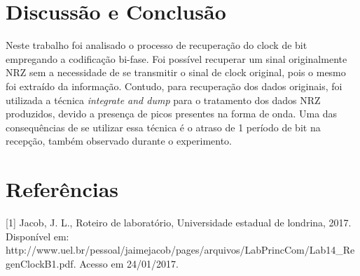\newpage
\section{Discussão e Conclusão}

	Neste trabalho foi analisado o processo de recuperação do clock de bit empregando a codificação bi-fase. Foi possível recuperar um sinal originalmente NRZ sem a necessidade de se transmitir o sinal de clock original, pois o mesmo foi extraído da informação. Contudo, para recuperação dos dados originais, foi utilizada a técnica \textit{integrate and dump} para o tratamento dos dados NRZ produzidos, devido a presença de picos presentes na forma de onda. Uma das consequências de se utilizar essa técnica é o atraso de 1 período de bit na recepção, também observado durante o experimento.
	
\newpage
\section{Referências}
[1] Jacob, J. L., Roteiro de laboratório, Universidade estadual de londrina, 2017. Disponível em: http://www.uel.br/pessoal/jaimejacob/pages/arquivos/LabPrincCom/Lab14\_RegenClockB1.pdf. Acesso em 24/01/2017.
